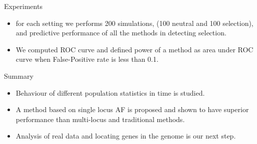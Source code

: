 \documentclass[t]{beamer} %
\begin{document}
%
%
%
%
%
%

\begin{frame}{Experiments}
\begin{itemize}
\item for each setting we performs 200 simulations, (100 neutral and 100 selection), and predictive performance of all the methods in detecting selection.
\item We computed ROC curve and defined power of a method as area under ROC curve when False-Positive rate is less than 0.1.
\end{itemize}
\end{frame}
\begin{frame}[Power of detection]
	\begin{figure}
		\centering \texttt{[image: \{power]}}
	\end{figure}
\end{frame}




\begin{frame}{Summary}
\begin{itemize}
\item Behaviour of different population statistics in time is studied.
\item A method based on single locus AF is proposed and shown to have superior performance than multi-locus and traditional methods.
\item Analysis of real data and locating genes in the genome is our next step.
\end{itemize}

\end{frame}
\end{document}

